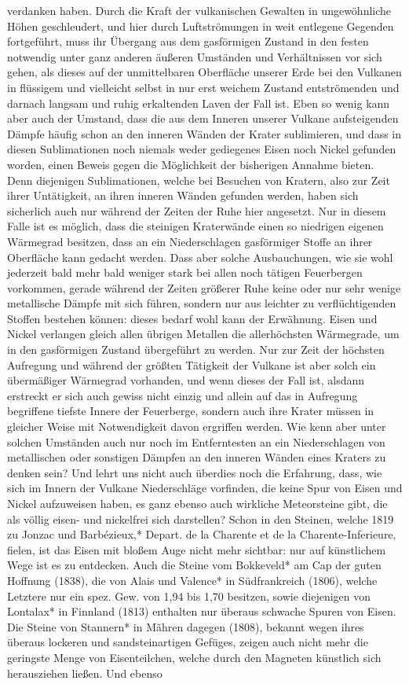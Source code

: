 \documentclass[a4paper, 8pt, oneside, polutonikogreek, german]{article}
\begin{document}
verdanken haben. Durch die Kraft der vulkanischen Gewalten in ungewöhnliche Höhen geschleudert, und hier durch Luftströmungen in weit entlegene Gegenden fortgeführt, muss ihr Übergang aus dem gasförmigen Zustand in den festen notwendig unter ganz anderen äußeren Umständen und Verhältnissen vor sich gehen, als dieses auf der unmittelbaren Oberfläche unserer Erde bei den Vulkanen in flüssigem und vielleicht selbst in nur erst weichem Zustand entströmenden und darnach langsam und ruhig erkaltenden Laven der Fall ist. Eben so wenig kann aber auch der Umstand, dass die aus dem Inneren unserer Vulkane aufsteigenden Dämpfe häufig schon an den inneren Wänden der Krater sublimieren, und dass in diesen Sublimationen noch niemals weder gediegenes Eisen noch Nickel gefunden worden, einen Beweis gegen die Möglichkeit der bisherigen Annahme bieten. Denn diejenigen Sublimationen, welche bei Besuchen von Kratern, also zur Zeit ihrer Untätigkeit, an ihren inneren Wänden gefunden werden, haben sich sicherlich auch nur während der Zeiten der Ruhe hier angesetzt. Nur in diesem Falle ist es möglich, dass die steinigen Kraterwände einen so niedrigen eigenen Wärmegrad besitzen, dass an ein Niederschlagen gasförmiger Stoffe an ihrer Oberfläche kann gedacht werden. Dass aber solche Ausbauchungen, wie sie wohl jederzeit bald mehr bald weniger stark bei allen noch tätigen Feuerbergen vorkommen, gerade während der Zeiten größerer Ruhe keine oder nur sehr wenige metallische Dämpfe mit sich führen, sondern nur aus leichter zu verflüchtigenden Stoffen bestehen können: dieses bedarf wohl kann der Erwähnung. Eisen und Nickel verlangen gleich allen übrigen Metallen die allerhöchsten Wärmegrade, um in den gasförmigen Zustand übergeführt zu werden. Nur zur Zeit der höchsten Aufregung und während der größten Tätigkeit der Vulkane ist aber solch ein übermäßiger Wärmegrad vorhanden, und wenn dieses der Fall ist, alsdann erstreckt er sich auch gewiss nicht einzig und allein auf das in Aufregung begriffene tiefste Innere der Feuerberge, sondern auch ihre Krater müssen in gleicher Weise mit Notwendigkeit davon ergriffen werden. Wie kenn aber unter solchen Umständen auch nur noch im Entferntesten an ein Niederschlagen von metallischen oder sonstigen Dämpfen an den inneren Wänden eines Kraters zu denken sein? Und lehrt uns nicht auch überdies noch die Erfahrung, dass, wie sich im Innern der Vulkane Niederschläge vorfinden, die keine Spur von Eisen und Nickel aufzuweisen haben, es ganz ebenso auch wirkliche Meteorsteine gibt, die als völlig eisen- und nickelfrei sich darstellen? Schon in den Steinen, welche 1819 zu Jonzac und Barbézieux,* Depart. de la Charente et de la Charente-Inferieure, fielen, ist das Eisen mit bloßem Auge nicht mehr sichtbar: nur auf künstlichem Wege ist es zu entdecken. Auch die Steine vom Bokkeveld* am Cap der guten Hoffnung (1838), die von Alais und Valence* in Südfrankreich (1806), welche Letztere nur ein spez. Gew. von 1,94 bis 1,70 besitzen, sowie diejenigen von Lontalax* in Finnland (1813) enthalten nur überaus schwache Spuren von Eisen. Die Steine von Stannern* in Mähren dagegen (1808), bekannt wegen ihres überaus lockeren und sandsteinartigen Gefüges, zeigen auch nicht mehr die geringste Menge von Eisenteilchen, welche durch den Magneten künstlich sich herausziehen ließen. Und ebenso 
\end{document}

